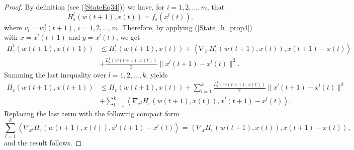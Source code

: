 \documentclass[11pt]{article}
\numberwithin{equation}{section}
\begin{document}
\begin{proof}
By definition (see (\ref{StateEq34})) we have, for $i=1,2, \ldots, m$, that
\begin{equation*}
	H^l_{\varepsilon}(w(t+1),x(t)) = f_{\varepsilon}(x^l(t)) ,
\end{equation*}
where $v_i=w^i_l(t+1)$, $i=1,2, \ldots, m$. Therefore, by applying (\ref{State_h_prop4}) with $x=x^l(t+1)$ and $y=x^l(t)$, we get
\begin{align*}
	H^l_{\varepsilon}(w(t+1),x(t+1)) 
	&\leq H^l_{\varepsilon}(w(t+1),x(t)) + \left\langle \nabla_{x^l} H^l_{\varepsilon}(w(t+1),x(t)), x(t+1)-x(t) \right\rangle \\
	&+ \frac{L^l_{\varepsilon}(w(t+1),x(t))}{2} \|x^l(t+1)-x^l(t)\|^2 .  
\end{align*}
Summing the last inequality over $l=1,2, \ldots, k$, yields
\begin{align*}
	H_{\varepsilon}(w(t+1),x(t+1)) 
	&\leq H_{\varepsilon}(w(t+1),x(t)) + \sum\limits_{l=1}^{k} \frac{L^l_{\varepsilon}(w(t+1),x(t))}{2} \|x^l(t+1)-x^l(t)\|^2 \\
	&+ \sum\limits_{l=1}^{k} \left\langle \nabla_{x^l} H_{\varepsilon}(w(t+1),x(t)), x^l(t+1)-x^l(t) \right\rangle   .
\end{align*}
Replacing the last term with the following compact form
\begin{equation*}
	\sum\limits_{l=1}^{k} \left\langle \nabla_{x^l} H_{\varepsilon}(w(t+1),x(t)), x^l(t+1)-x^l(t) \right\rangle  = \left\langle \nabla_x H_{\varepsilon}(w(t+1),x(t)), x(t+1)-x(t) \right\rangle ,
\end{equation*}
and the result follows.
\end{proof}
\end{document}

